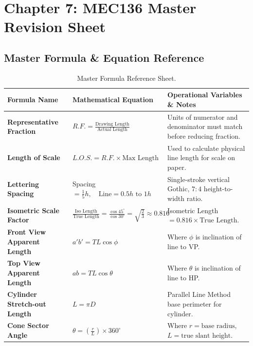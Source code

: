 \chapter{Chapter 7: MEC136 Master Revision Sheet}

\section{Master Formula \& Equation Reference}

\begin{table}[htbp]
\centering
\small
\begin{tabularx}{\textwidth}{l X X}
\toprule
\textbf{Formula Name} & \textbf{Mathematical Equation} & \textbf{Operational Variables \& Notes} \\
\midrule
\textbf{Representative Fraction} & $R.F. = \frac{\text{Drawing Length}}{\text{Actual Length}}$ & Units of numerator and denominator must match before reducing fraction. \\
\addlinespace
\textbf{Length of Scale} & $L.O.S. = R.F. \times \text{Max Length}$ & Used to calculate physical line length for scale on paper. \\
\addlinespace
\textbf{Lettering Spacing} & Spacing $= \frac{1}{5} h, \quad \text{Line} = 0.5h \text{ to } 1h$ & Single-stroke vertical Gothic, $7:4$ height-to-width ratio. \\
\addlinespace
\textbf{Isometric Scale Factor} & $\frac{\text{Iso Length}}{\text{True Length}} = \frac{\cos 45^\circ}{\cos 30^\circ} = \sqrt{\frac{2}{3}} \approx 0.816$ & Isometric Length $= 0.816 \times \text{True Length}$. \\
\addlinespace
\textbf{Front View Apparent Length} & $a'b' = TL \cos \phi$ & Where $\phi$ is inclination of line to VP. \\
\addlinespace
\textbf{Top View Apparent Length} & $ab = TL \cos \theta$ & Where $\theta$ is inclination of line to HP. \\
\addlinespace
\textbf{Cylinder Stretch-out Length} & $L = \pi D$ & Parallel Line Method base perimeter for cylinder. \\
\addlinespace
\textbf{Cone Sector Angle} & $\theta = \left( \frac{r}{L} \right) \times 360^\circ$ & Where $r = \text{base radius}$, $L = \text{true slant height}$. \\
\bottomrule
\end{tabularx}
\caption{Master Formula Reference Sheet.}
\label{tab:master-formulas}
\end{table}

